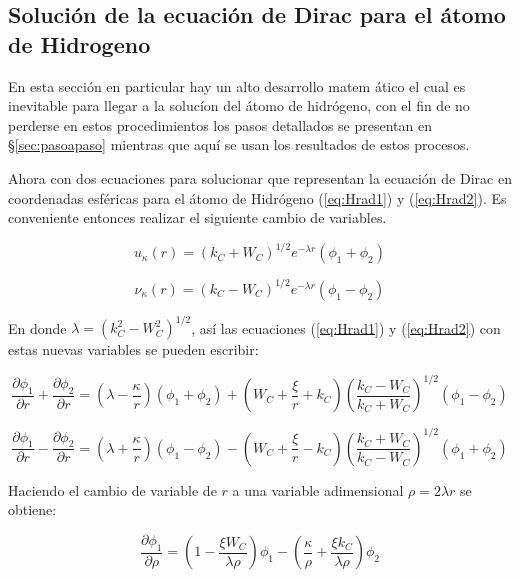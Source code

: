 \documentclass[a4paper, 12pt]{article} %
\begin{document}
\subsection{Soluci\'on de la ecuaci\'on de Dirac para el 
\'atomo de Hidrogeno}\label{sec:solucion} 

En esta secci\'on en particular hay un alto desarrollo matem \'atico 
el cual es inevitable para llegar a la soluc\'ion del \'atomo 
de hidr\'ogeno, con el fin de no perderse en estos procedimientos
los pasos detallados se presentan en \S \ref{sec:pasoapaso} mientras
que aqu\'i se usan los resultados de estos procesos.
 
Ahora con dos ecuaciones para solucionar que representan  la ecuaci\'on 
de Dirac en coordenadas esf\'ericas para el \'atomo de Hidr\'ogeno
(\ref{eq:Hrad1}) y (\ref{eq:Hrad2}). Es conveniente entonces 
realizar el siguiente cambio de variables.

\begin{equation}\label{eq:cdv}
u_{\kappa}(r) = (k_C + W_C)^{1/2} e^{-\lambda r}(\phi_1 + \phi_2)
\end{equation}

\begin{equation}
\nu_{\kappa}(r) = (k_C - W_C )^{1/2} e^{-\lambda r} (\phi_1 - \phi_2)
\end{equation}

En donde $\lambda = (k_C^2 - W_C^2)^{1/2}$, as\'i las ecuaciones 
(\ref{eq:Hrad1}) y (\ref{eq:Hrad2}) con estas nuevas variables 
se pueden escribir:

\begin{equation}\label{eq:phi1-1}
\dfrac{\partial \phi_1}{\partial r} + \dfrac{\partial \phi_2}{\partial r}
= \left( \lambda - \dfrac{\kappa}{r} \right)(\phi_1 + \phi_2) 
+ \left ( W_C + \dfrac{\xi}{r} + k_C \right) 
\left(\dfrac{k_C - W_C }{k_C + W_C} \right)^{1/2} (\phi_1 - \phi_2)
\end{equation}

\begin{equation}\label{eq:phi2-1}
\dfrac{\partial \phi_1}{\partial r} - \dfrac{\partial \phi_2}{\partial r}
= \left( \lambda + \dfrac{\kappa}{r} \right)(\phi_1 - \phi_2) 
- \left ( W_C + \dfrac{\xi}{r} - k_C \right) 
\left(\dfrac{k_C + W_C }{k_C - W_C} \right)^{1/2} (\phi_1 + \phi_2)
\end{equation}

Haciendo el cambio de variable de $r$ a una variable adimensional $\rho = 2 \lambda r$
se obtiene:

\begin{equation}\label{eq:sol1}
\dfrac{\partial \phi_1}{\partial \rho} = \left( 1-\dfrac{\xi W_C}{\lambda  \rho} \right) 
\phi_1 - \left( \dfrac{\kappa}{\rho} + \dfrac{\xi k_C}{\lambda \rho}  \right)\phi_2
\end{equation}
\end{document}
